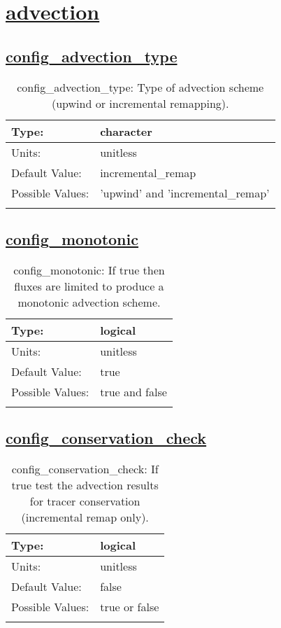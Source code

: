 \section[advection]{\hyperref[sec:nm_tab_advection]{advection}}
\label{sec:nm_sec_advection}
\subsection[config\_advection\_type]{\hyperref[sec:nm_tab_advection]{config\_advection\_type}}
\label{subsec:nm_sec_config_advection_type}
\begin{center}
\begin{longtable}{| p{2.0in} || p{4.0in} |}
    \hline
    Type: & character \\
    \hline
    Units: & \si{unitless} \\
    \hline
    Default Value: & incremental\_remap \\
    \hline
    Possible Values: & 'upwind' and 'incremental\_remap' \\
    \hline
    \caption{config\_advection\_type: Type of advection scheme (upwind or incremental remapping).}
\end{longtable}
\end{center}
\subsection[config\_monotonic]{\hyperref[sec:nm_tab_advection]{config\_monotonic}}
\label{subsec:nm_sec_config_monotonic}
\begin{center}
\begin{longtable}{| p{2.0in} || p{4.0in} |}
    \hline
    Type: & logical \\
    \hline
    Units: & \si{unitless} \\
    \hline
    Default Value: & true \\
    \hline
    Possible Values: & true and false \\
    \hline
    \caption{config\_monotonic: If true then fluxes are limited to produce a monotonic advection scheme.}
\end{longtable}
\end{center}
\subsection[config\_conservation\_check]{\hyperref[sec:nm_tab_advection]{config\_conservation\_check}}
\label{subsec:nm_sec_config_conservation_check}
\begin{center}
\begin{longtable}{| p{2.0in} || p{4.0in} |}
    \hline
    Type: & logical \\
    \hline
    Units: & \si{unitless} \\
    \hline
    Default Value: & false \\
    \hline
    Possible Values: & true or false \\
    \hline
    \caption{config\_conservation\_check: If true test the advection results for tracer conservation (incremental remap only).}
\end{longtable}
\end{center}
